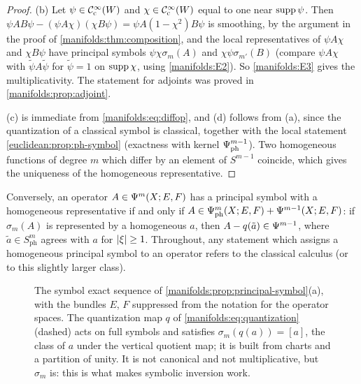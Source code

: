 \begin{proof}
(b) Let $\psi\in\mathcal{C}^\infty_{\mathrm{c}}(W)$ and $\chi\in\mathcal{C}^\infty_{\mathrm{c}}(W)$ equal to one near $\operatorname{supp}\psi$. Then
$\psi AB\psi-(\psi A\chi)(\chi B\psi)=\psi A(1-\chi^2)B\psi$ is smoothing, by the
argument in the proof of \cref{manifolds:thm:composition}, and the local
representatives of $\psi A\chi$ and $\chi B\psi$ have principal symbols
$\psi\chi\sigma_m(A)$ and $\chi\psi\sigma_{m'}(B)$ (compare $\psi A\chi$ with
$\tilde\psi A\tilde\psi$ for $\tilde\psi=1$ on $\operatorname{supp}\chi$, using \ref{manifolds:E2}).
So \ref{manifolds:E3} gives the multiplicativity. The statement for adjoints was
proved in \cref{manifolds:prop:adjoint}.

(c) is immediate from \eqref{manifolds:eq:diffop}, and (d) follows from (a),
since the quantization of a classical symbol is classical, together with the local
statement \cref{euclidean:prop:ph-symbol} (exactness with kernel
$\Psi^{m-1}_{\mathrm{ph}}$). Two homogeneous functions of degree $m$ which differ by an element
of $S^{m-1}$ coincide, which gives the uniqueness of the homogeneous representative.
\end{proof}

Conversely, an operator $A\in\Psi^{m}(X;E,F)$ has a principal symbol with a homogeneous
representative if and only if $A\in\Psi^{m}_{\mathrm{ph}}(X;E,F)+\Psi^{m-1}(X;E,F)$: if
$\sigma_m(A)$ is represented by a homogeneous $a$, then $A-q(\tilde a)\in\Psi^{m-1}$, where
$\tilde a\in S^m_{\mathrm{ph}}$ agrees with $a$ for $\lvert \xi\rvert\ge1$. Throughout, any statement which
assigns a homogeneous principal symbol to an operator refers to the classical calculus
(or to this slightly larger class).

\begin{figure}[ht]
\centering
{}
\caption{The symbol exact sequence of
\cref{manifolds:prop:principal-symbol}(a), with the bundles $E$, $F$
suppressed from the notation for the operator spaces. The quantization map $q$ of
\eqref{manifolds:eq:quantization} (dashed) acts on full symbols and satisfies
$\sigma_m(q(a))=[a]$, the class of $a$ under the vertical quotient map; it is built from
charts and a partition of unity. It is not
canonical and not multiplicative, but $\sigma_m$ is: this is what makes
symbolic inversion work.}
\label{manifolds:fig:exact-sequence}
\end{figure}

